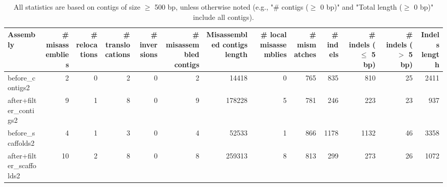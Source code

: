 \documentclass[12pt,a4paper]{article}
\begin{document}
\begin{table}[ht]
\begin{center}
\caption{All statistics are based on contigs of size $\geq$ 500 bp, unless otherwise noted (e.g., "\# contigs ($\geq$ 0 bp)" and "Total length ($\geq$ 0 bp)" include all contigs).}
\begin{tabular}{|l*{12}{|r}|}
\hline
Assembly & \# misassemblies &     \# relocations &     \# translocations &     \# inversions & \# misassembled contigs & Misassembled contigs length & \# local misassemblies & \# mismatches & \# indels &     \# indels ($\leq$ 5 bp) &     \# indels ($>$ 5 bp) & Indels length \\ \hline
before\_contigs2 & 2 & 0 & 2 & 0 & 2 & 14418 & 0 & 765 & 835 & 810 & 25 & 2411 \\ \hline
after+filter\_contigs2 & 9 & 1 & 8 & 0 & 9 & 178228 & 5 & 781 & 246 & 223 & 23 & 937 \\ \hline
before\_scaffolds2 & 4 & 1 & 3 & 0 & 4 & 52533 & 1 & 866 & 1178 & 1132 & 46 & 3358 \\ \hline
after+filter\_scaffolds2 & 10 & 2 & 8 & 0 & 8 & 259313 & 8 & 813 & 299 & 273 & 26 & 1072 \\ \hline
\end{tabular}
\end{center}
\end{table}
\end{document}
